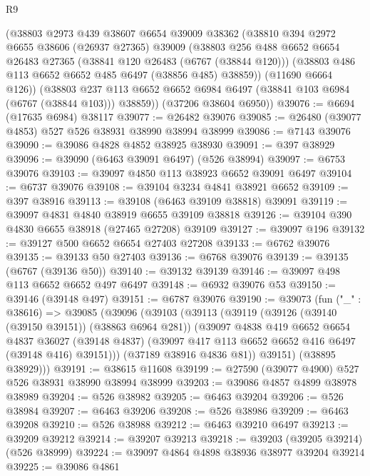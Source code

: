 \begin{lexlean}{R9}
\begin{coremodule}
      (@38803
        @2973
        @439
        @38607
        @6654
        @39009
        @38362
        (@38810
          @394
          @2972
          @6655
          @38606
          (@26937 @27365)
          @39009
          (@38803
            @256
            @488
            @6652
            @6654
            @26483
            @27365
            (@38841 @120 @26483 (@6767 (@38844 @120)))
            (@38803 @486 @113 @6652 @6652 @485 @6497 (@38856 @485) @38859))
          (@11690 @6664 @126))
        (@38803 @237 @113 @6652 @6652 @6984 @6497 (@38841 @103 @6984 (@6767 (@38844 @103))) @38859))
      (@37206 @38604 @6950))
@39076 := @6694 (@17635 @6984) @38117
@39077 := @26482 @39076
@39085 := @26480 (@39077 @4853) @527 @526 @38931 @38990 @38994 @38999
@39086 := @7143 @39076
@39090 := @39086 @4828 @4852 @38925 @38930
@39091 := @397 @38929
@39096 := @39090 (@6463 @39091 @6497) (@526 @38994)
@39097 := @6753 @39076
@39103 := @39097 @4850 @113 @38923 @6652 @39091 @6497
@39104 := @6737 @39076
@39108 := @39104 @3234 @4841 @38921 @6652
@39109 := @397 @38916
@39113 := @39108 (@6463 @39109 @38818) @39091
@39119 := @39097 @4831 @4840 @38919 @6655 @39109 @38818
@39126 := @39104 @390 @4830 @6655 @38918 (@27465 @27208) @39109
@39127 := @39097 @196
@39132 := @39127 @500 @6652 @6654 @27403 @27208
@39133 := @6762 @39076
@39135 := @39133 @50 @27403
@39136 := @6768 @39076
@39139 := @39135 (@6767 (@39136 @50))
@39140 := @39132 @39139
@39146 := @39097 @498 @113 @6652 @6652 @497 @6497
@39148 := @6932 @39076 @53
@39150 := @39146 (@39148 @497)
@39151 := @6787 @39076
@39190 := @39073
    (fun ("_" : @38616) =>
    @39085
      (@39096
        (@39103
          (@39113
            (@39119
              (@39126 (@39140 (@39150 @39151)) (@38863 @6964 @281))
              (@39097
                @4838
                @419
                @6652
                @6654
                @4837
                @36027
                (@39148 @4837)
                (@39097 @417 @113 @6652 @6652 @416 @6497 (@39148 @416) @39151)))
            (@37189 @38916 @4836 @81))
          @39151)
        (@38895 @38929)))
@39191 := @38615 @11608
@39199 := @27590 (@39077 @4900) @527 @526 @38931 @38990 @38994 @38999
@39203 := @39086 @4857 @4899 @38978 @38989
@39204 := @526 @38982
@39205 := @6463 @39204
@39206 := @526 @38984
@39207 := @6463 @39206
@39208 := @526 @38986
@39209 := @6463 @39208
@39210 := @526 @38988
@39212 := @6463 @39210 @6497
@39213 := @39209 @39212
@39214 := @39207 @39213
@39218 := @39203 (@39205 @39214) (@526 @38999)
@39224 := @39097 @4864 @4898 @38936 @38977 @39204 @39214
@39225 := @39086 @4861

\end{coremodule}
\end{lexlean}
